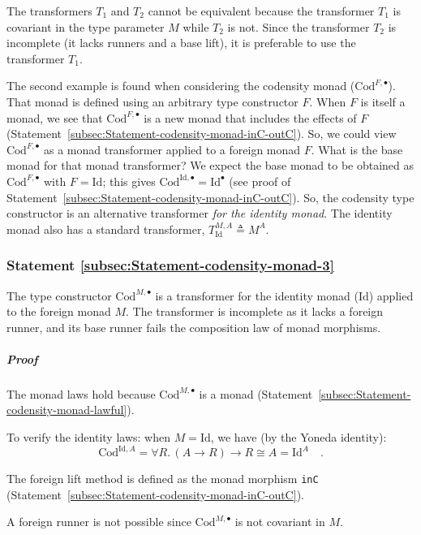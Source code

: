 The transformers $T_{1}$ and $T_{2}$ cannot be equivalent because
the transformer $T_{1}$ is covariant in the type parameter $M$ while
$T_{2}$ is not. Since the transformer $T_{2}$ is incomplete (it
lacks runners and a base lift), it is preferable to use the transformer
$T_{1}$.

The second example is found when considering the codensity monad ($\text{Cod}^{F,\bullet}$).
That monad is defined using an arbitrary type constructor $F$. When
$F$ is itself a monad, we see that $\text{Cod}^{F,\bullet}$ is a
new monad that includes the effects of $F$ (Statement~\ref{subsec:Statement-codensity-monad-inC-outC}).
So, we could view $\text{Cod}^{F,\bullet}$ as a monad transformer
applied to a foreign monad $F$. What is the base monad for that monad
transformer? We expect the base monad to be obtained as $\text{Cod}^{F,\bullet}$
with $F=\text{Id}$; this gives $\text{Cod}^{\text{Id},\bullet}=\text{Id}^{\bullet}$
(see proof of Statement~\ref{subsec:Statement-codensity-monad-inC-outC}).
So, the codensity type constructor is an alternative transformer \emph{for
the identity monad}. The identity monad also has a standard transformer,
$T_{\text{Id}}^{M,A}\triangleq M^{A}$. 

\subsubsection{Statement \label{subsec:Statement-codensity-monad-3}\ref{subsec:Statement-codensity-monad-3} }

The type constructor $\text{Cod}^{M,\bullet}$ is a transformer for
the identity monad ($\text{Id}$) applied to the foreign monad $M$.
The transformer is incomplete as it lacks a foreign runner, and its
base runner fails the composition law of monad morphisms.

\subparagraph{Proof}

The monad laws hold because $\text{Cod}^{M,\bullet}$ is a monad (Statement~\ref{subsec:Statement-codensity-monad-lawful}). 

To verify the identity laws: when $M=\text{Id}$, we have (by the
Yoneda identity):
\[
\text{Cod}^{\text{Id},A}=\forall R.\,(A\rightarrow R)\rightarrow R\cong A=\text{Id}^{A}\quad.
\]

The foreign lift method is defined as the monad morphism \lstinline!inC!
(Statement~\ref{subsec:Statement-codensity-monad-inC-outC}).

A foreign runner is not possible since $\text{Cod}^{M,\bullet}$ is
not covariant in $M$. 

